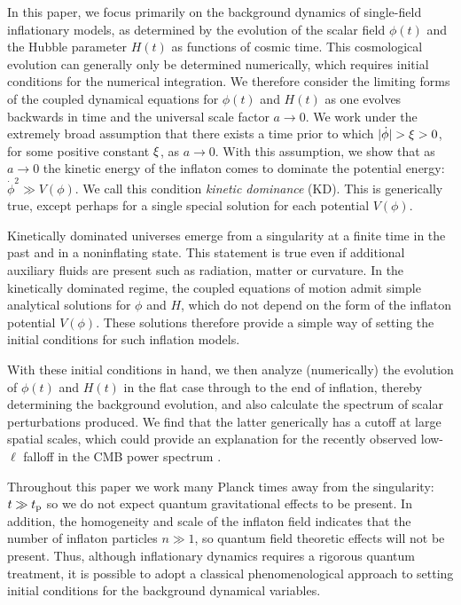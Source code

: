 In this paper, we focus primarily on the background dynamics of
single-field inflationary models, as determined by the evolution of
the scalar field $\phi(t)$ and the Hubble parameter $H(t)$ as
functions of cosmic time.  This cosmological evolution can generally
only be determined numerically, which requires initial conditions for
the numerical integration.  We therefore consider the limiting forms
of the coupled dynamical equations for $\phi(t)$ and $H(t)$ as one
evolves backwards in time and the universal scale factor $a\to 0$. We
work under the extremely broad assumption that there exists a time
prior to which $|\dot{\phi}| > \xi > 0$, for some positive
constant $\xi$, as $a \to 0$.  With this assumption, we show that
as $a\to 0$ the kinetic energy of the inflaton comes to dominate the
potential energy: $\dot{\phi}^2\gg V(\phi)$. We call this condition
{\em kinetic dominance} (KD). This is generically true, except perhaps
for a single special solution for each potential $V(\phi)$.

Kinetically dominated universes emerge from a singularity at a finite
time in the past and in a noninflating state. This statement is true
even if additional auxiliary fluids are present such as radiation,
matter or curvature.  In the kinetically dominated regime, the coupled
equations of motion admit simple analytical solutions for $\phi$ and
$H$, which do not depend on the form of the inflaton potential
$V(\phi)$.  These solutions therefore provide a simple way of setting
the initial conditions for such inflation models.

With these initial conditions in hand, we then analyze (numerically)
the evolution of $\phi(t)$ and $H(t)$ in the flat case through to the
end of inflation, thereby determining the background evolution, and
also calculate the spectrum of scalar perturbations produced. We find
that the latter generically has a cutoff at large spatial scales,
which could provide an explanation for the recently observed
low-$\ell$ falloff in the CMB power spectrum
\citep{hinshaw_nine-year_2012,planck_collaboration_planck_2013}.
 
Throughout this paper we work many Planck times away from the
singularity: $t\gg t_{\mathrm{p}}$ so we do not expect quantum gravitational
effects to be present.  In addition, the homogeneity and scale of the
inflaton field indicates that the number of inflaton particles
$n\gg1$, so quantum field theoretic effects will not be present.
Thus, although inflationary dynamics requires a rigorous quantum
treatment, it is possible to adopt a classical phenomenological
approach to setting initial conditions for the background dynamical
variables.  

